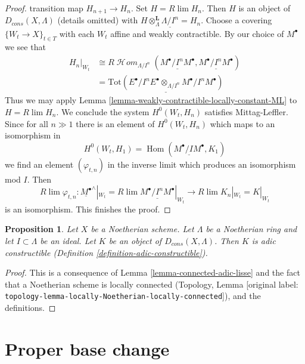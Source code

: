 \documentclass[10pt,a4paper]{article}
\theoremstyle{plain}
\newtheorem{proposition}[subsection]{Proposition}
\theoremstyle{definition}
\theoremstyle{remark}
\numberwithin{equation}{subsection}
\def\lim{\mathop{\mathrm{lim}}\nolimits}
\def\Hom{\mathop{\mathrm{Hom}}\nolimits}
\def\SheafHom{\mathop{\mathcal{H}\!\mathit{om}}\nolimits}
\begin{document}
\begin{proof}
transition map $H_{n + 1} \to H_n$. Set $H = R\lim H_n$. Then $H$ is an
object of $D_{cons}(X, \Lambda)$ (details omitted) with
$H \otimes_\Lambda^\mathbf{L} \underline{\Lambda/I^n} = H_n$.
Choose a covering $\{W_t \to X\}_{t \in T}$ with each $W_t$
affine and weakly contractible. By our choice of $M^\bullet$
we see that
\begin{align*}
H_n|_{W_t} & \cong 
R\SheafHom_{\Lambda/I^n}(\underline{M^\bullet/I^nM^\bullet},
\underline{M^\bullet/I^nM^\bullet}) \\
& =
\underline{
\text{Tot}(E^\bullet/I^nE^\bullet \otimes_{\Lambda/I^n} M^\bullet/I^nM^\bullet)
}
\end{align*}
Thus we may apply Lemma \ref{lemma-weakly-contractible-locally-constant-ML}
to $H = R\lim H_n$. We conclude the system $H^0(W_t, H_n)$ satisfies
Mittag-Leffler. Since for all $n \gg 1$ there is an element of $H^0(W_t, H_n)$
which maps to an isomorphism in
$$
H^0(W_t, H_1) = \Hom(\underline{M^\bullet/IM^\bullet}, K_1)
$$
we find an element $(\varphi_{t, n})$
in the inverse limit which produces an isomorphism mod $I$. Then
$$
R\lim \varphi_{t, n} :
\underline{M^\bullet}^\wedge|_{W_t} =
R\lim \underline{M^\bullet/I^nM^\bullet}|_{W_t}
\longrightarrow
R\lim K_n|_{W_t} = K|_{W_t}
$$
is an isomorphism. This finishes the proof.
\end{proof}

\begin{proposition}
\label{proposition-Noetherian-adic-constructible}
Let $X$ be a Noetherian scheme. Let $\Lambda$ be a Noetherian ring and
let $I \subset \Lambda$ be an ideal. Let $K$ be an object of
$D_{cons}(X, \Lambda)$. Then $K$ is adic constructible
(Definition \ref{definition-adic-constructible}).
\end{proposition}

\begin{proof}
This is a consequence of Lemma \ref{lemma-connected-adic-lisse}
and the fact that a Noetherian scheme is locally connected
(Topology, Lemma [original label: \nolinkurl{topology-lemma-locally-Noetherian-locally-connected}]),
and the definitions.
\end{proof}







\section{Proper base change}
\label{section-proper-base-change}
\end{document}
